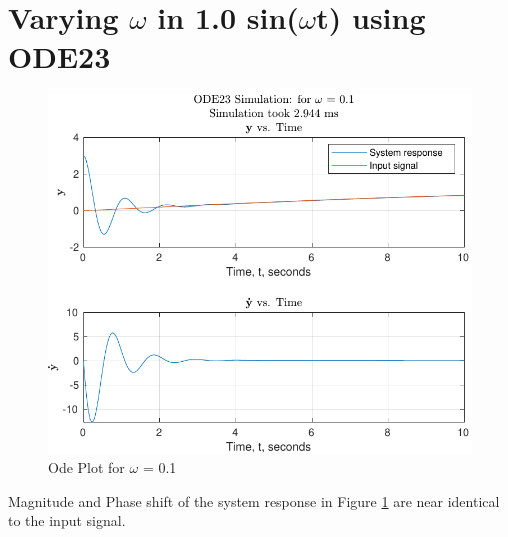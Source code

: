 \documentclass[12pt]{article}
\begin{document}
	\newpage			
	\section{Varying $\omega$ in 1.0 sin($\omega$t) using ODE23}
		
		
		
		
		\begin{figure}[H]
			\centering
			\includegraphics[width=1\linewidth]{Code/Fig/ode_sin_input_0.1}
			\caption{Ode Plot for $\omega$ = 0.1}
			\label{fig:odesininput0_1}
		\end{figure}
		Magnitude and Phase shift of the system response in Figure \ref{fig:odesininput0_1} are near identical to the input signal.
		
\end{document}
